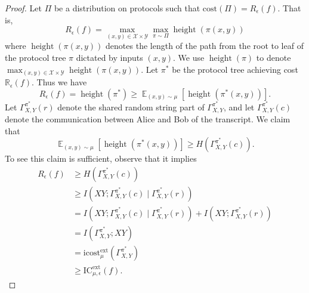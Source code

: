 \documentclass[11pt]{amsart}
\theoremstyle{plain}
\theoremstyle{definition}
\theoremstyle{plain}
\newcommand{\calX}{\mathcal{X}}
\newcommand{\calY}{\mathcal{Y}}
\newcommand{\cost}{\mathrm{cost}}
\newcommand{\ICext}{\mathrm{IC}^{\mathrm{ext}}}
\newcommand{\icostext}{\mathrm{icost}^{\mathrm{ext}}}
\newcommand{\R}{\mathbb{R}}
\DeclareMathOperator{\height}{height}
\DeclareMathOperator*{\E}{\mathbb{E}}
\begin{document}
\begin{proof}

Let $\Pi$ be a distribution on protocols such that $\cost(\Pi) = R_\epsilon(f)$. That is,
$$R_\epsilon(f) = \max_{(x,y) \in \calX\times\calY}\max_{\pi \sim \Pi}\height(\pi(x,y))$$ 
where $\height(\pi(x,y))$ denotes the length of the path from the root to leaf of the protocol tree $\pi$ dictated by inputs $(x,y)$. We use $\height(\pi)$ to denote $\max_{(x,y) \in \calX\times\calY}\height(\pi(x,y))$. Let $\pi^*$ be the protocol tree achieving cost $\R_\epsilon(f)$. Thus we have
$$R_\epsilon(f) = \height(\pi^*) \geq \E_{(x,y) \sim \mu} [\height(\pi^*(x,y))].$$
Let $\Gamma^{\pi^*}_{X,Y}(r)$ denote the shared random string part of $\Gamma^{\pi^*}_{X,Y}$, and let $\Gamma^{\pi^*}_{X,Y}(c)$ denote the communication between Alice and Bob of the transcript. We claim that
$$\E_{(x,y) \sim \mu} [\height(\pi^*(x,y))] \geq H(\Gamma^{\pi^*}_{X,Y}(c)).$$
To see this claim is sufficient, observe that it implies 
\begin{align*}
R_\epsilon(f) &\geq H(\Gamma^{\pi^*}_{X,Y}(c)) \\
&\geq I(XY; \Gamma^{\pi^*}_{X,Y}(c) \mid \Gamma^{\pi^*}_{X,Y}(r)) \\
&= I(XY;\Gamma^{\pi^*}_{X,Y}(c) \mid \Gamma^{\pi^*}_{X,Y}(r)) + I(XY;\Gamma^{\pi^*}_{X,Y}(r))\\
&= I(\Gamma^{\pi^*}_{X,Y}; XY) \\
&= \icostext_\mu(\Gamma^{\pi^*}_{X,Y})\\
&\geq \ICext_{\mu,\epsilon}(f).
\end{align*}


\end{proof}
\end{document}
